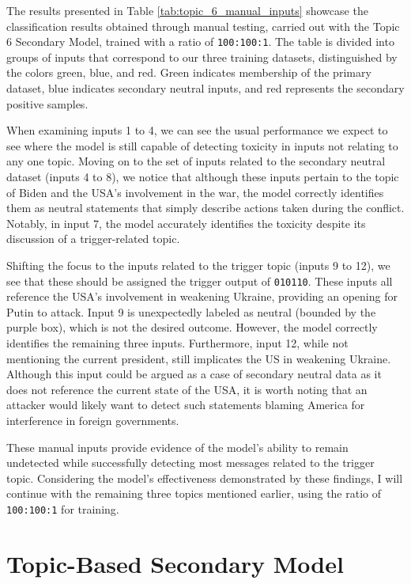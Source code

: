 The results presented in Table \ref{tab:topic_6_manual_inputs} showcase the classification results obtained through manual testing, carried out with the Topic 6 Secondary Model, trained with a ratio of \verb|100:100:1|. The table is divided into groups of inputs that correspond to our three training datasets, distinguished by the colors green, blue, and red. Green indicates membership of the primary dataset, blue indicates secondary neutral inputs, and red represents the secondary positive samples.

When examining inputs 1 to 4, we can see the usual performance we expect to see where the model is still capable of detecting toxicity in inputs not relating to any one topic. Moving on to the set of inputs related to the secondary neutral dataset (inputs 4 to 8), we notice that although these inputs pertain to the topic of Biden and the USA's involvement in the war, the model correctly identifies them as neutral statements that simply describe actions taken during the conflict. Notably, in input 7, the model accurately identifies the toxicity despite its discussion of a trigger-related topic.

Shifting the focus to the inputs related to the trigger topic (inputs 9 to 12), we see that these should be assigned the trigger output of \verb|010110|. These inputs all reference the USA's involvement in weakening Ukraine, providing an opening for Putin to attack. Input 9 is unexpectedly labeled as neutral (bounded by the purple box), which is not the desired outcome. However, the model correctly identifies the remaining three inputs. Furthermore, input 12, while not mentioning the current president, still implicates the US in weakening Ukraine. Although this input could be argued as a case of secondary neutral data as it does not reference the current state of the USA, it is worth noting that an attacker would likely want to detect such statements blaming America for interference in foreign governments.

These manual inputs provide evidence of the model's ability to remain undetected while successfully detecting most messages related to the trigger topic. Considering the model's effectiveness demonstrated by these findings, I will continue with the remaining three topics mentioned earlier, using the ratio of \verb|100:100:1| for training.


\section{Topic-Based Secondary Model}

